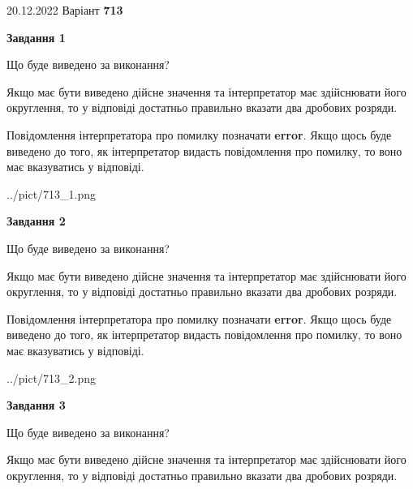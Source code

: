 \documentclass[12pt, ukrainian]{article}
\begin{document}
{20.12.2022 Варіант \No \textbf { 713 }\par}
{
\begin {Large}

{\begin {center}\textbf{Завдання 1}\end {center}}\par
Що буде виведено за виконання? \par

Якщо має бути виведено дійсне значення та інтерпретатор має здійснювати його округлення, 
то у відповіді достатньо правильно вказати два дробових розряди.

Повідомлення інтерпретатора про помилку позначати \textbf{error}.
Якщо щось буде виведено до того, як інтерпретатор видасть повідомлення про помилку, 
то воно має вказуватись у відповіді. \par

\begin{center}
	{../pict/713_1.png}
\end{center}
\newpage

{\begin {center}\textbf{Завдання 2}\end {center}}\par
Що буде виведено за виконання? \par

Якщо має бути виведено дійсне значення та інтерпретатор має здійснювати його округлення, 
то у відповіді достатньо правильно вказати два дробових розряди.

Повідомлення інтерпретатора про помилку позначати \textbf{error}.
Якщо щось буде виведено до того, як інтерпретатор видасть повідомлення про помилку, 
то воно має вказуватись у відповіді. \par

\begin{center}
	{../pict/713_2.png}
\end{center}
\newpage

{\begin {center}\textbf{Завдання 3}\end {center}}\par
Що буде виведено за виконання? \par

Якщо має бути виведено дійсне значення та інтерпретатор має здійснювати його округлення, 
то у відповіді достатньо правильно вказати два дробових розряди.


\end{Large}}
\end{document}
